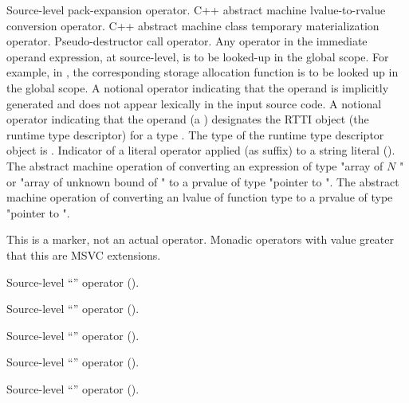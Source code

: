  Source-level pack-expansion operator.
 C++ abstract machine lvalue-to-rvalue conversion operator.
 C++ abstract machine class temporary materialization operator.
 Pseudo-destructor call operator.
 Any operator in the immediate operand expression, at source-level, is to be looked-up in the global scope.  For example, in , the corresponding storage allocation function  is to be looked up in the global scope.
 A notional operator indicating that the operand is implicitly generated and does not appear lexically in the input source code.
  A notional operator indicating that the operand (a ) 
   designates the RTTI object (the runtime type descriptor) for a type .  The type of the runtime type descriptor object is .
 Indicator of a literal operator applied (as suffix) to a string literal ().
 The abstract machine operation of converting an expression of type "array of $N$ " 
or "array of unknown bound of " to a prvalue of type "pointer to ".
 The abstract machine operation of converting an lvalue of function type  to a prvalue of
type "pointer to ".


 This is a marker, not an actual operator. Monadic operators with 
value greater that this are MSVC extensions.

Source-level ``'' operator ().

 Source-level ``'' operator ().

 Source-level ``'' operator ().

 Source-level ``'' operator ().

 Source-level ``'' operator ().

